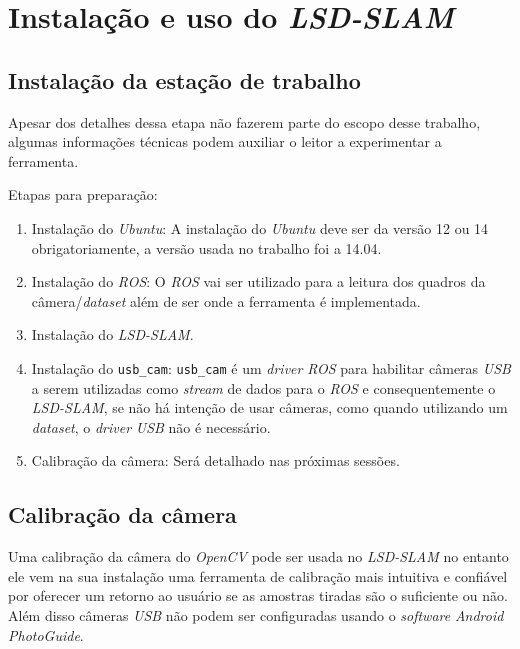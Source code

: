 \chapter{Instalação e uso do \textit{LSD-SLAM}}

\section{Instalação da estação de trabalho}

Apesar dos detalhes dessa etapa não fazerem parte do escopo desse trabalho, algumas informações técnicas podem auxiliar o leitor a experimentar a ferramenta.

Etapas para preparação:

\begin{enumerate}
	\item{Instalação do \textit{Ubuntu}: A instalação do \textit{Ubuntu} deve ser da versão 12 ou 14 obrigatoriamente, a versão usada no trabalho foi a 14.04.}
	\item{Instalação do  \textit{ROS}: O \textit{ROS} vai ser utilizado para a leitura dos quadros da câmera/\textit{dataset} além de ser onde a ferramenta é implementada.\cite{ROS-Tutorial}}
	\item{Instalação do \textit{LSD-SLAM}.\cite{GitHub-LSD-SLAM}}
	\item{Instalação do  \texttt{usb\_cam}: \texttt{usb\_cam} é um \textit{driver} \textit{ROS} para habilitar câmeras \textit{USB} a serem utilizadas como \textit{stream} de dados para o \textit{ROS} e consequentemente o \textit{LSD-SLAM}, se não há intenção de usar câmeras, como quando utilizando um \textit{dataset}, o \textit{driver} \textit{USB} não é necessário.}
	\item{Calibração da câmera: Será detalhado nas próximas sessões.}
\end{enumerate}

\section{Calibração da câmera}

Uma calibração da câmera do \textit{OpenCV} pode ser usada no \textit{LSD-SLAM} no entanto ele vem na sua instalação uma ferramenta de calibração mais intuitiva e confiável por oferecer um retorno ao usuário se as amostras tiradas são o suficiente ou não. Além disso câmeras \textit{USB} não podem ser configuradas usando o \textit{software} \textit{Android} \textit{PhotoGuide}.

